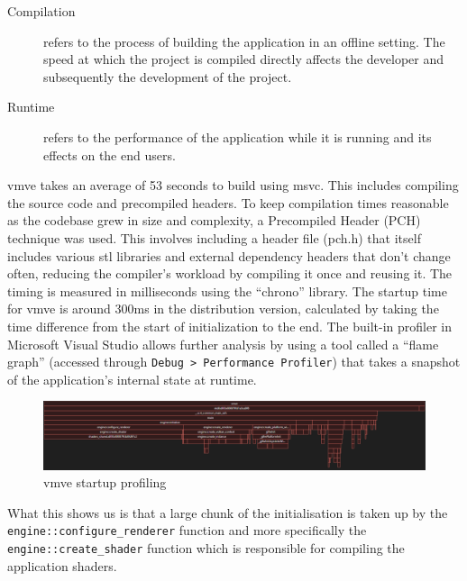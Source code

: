 \documentclass[11pt]{article}
\begin{document}
\begin{description}
  \item[Compilation] refers to the process of building the application in an offline
  setting. The speed at which the project is compiled directly affects the
  developer and subsequently the development of the project.
  \item[Runtime] refers to the performance of the application while it is running and
  its effects on the end users.
\end{description}

\gls*{vmve} takes an average of 53 seconds to build using \gls*{msvc}. This
includes compiling the source code and precompiled headers. To keep compilation
times reasonable as the codebase grew in size and complexity, a Precompiled
Header (PCH) technique was used. This involves including a header file (pch.h)
that itself includes various \gls*{stl} libraries and external dependency
headers that don't change often, reducing the compiler's workload by compiling
it once and reusing it. The timing is measured in milliseconds  using the
``chrono'' library. The startup time for \gls*{vmve} is around 300ms in the
distribution version, calculated by taking the time difference from the start of
initialization to the end. The built-in profiler in Microsoft Visual Studio
allows further analysis by using a tool called a ``flame graph'' (accessed
through \lstinline{Debug > Performance Profiler}) that takes a snapshot of the
application's internal state at runtime.

\begin{figure}[H]
  \centering
  \includegraphics[width=\textwidth]{images/startup_profiling_graph.png}
  \caption{\gls*{vmve} startup profiling}
  \label{fig:vmve_startup_profiling}
\end{figure}

What this shows us is that a large chunk of the initialisation is taken up by
the \lstinline{engine::configure_renderer} function and more specifically the
\lstinline{engine::create_shader} function which is responsible for compiling
the application shaders.
\end{document}
